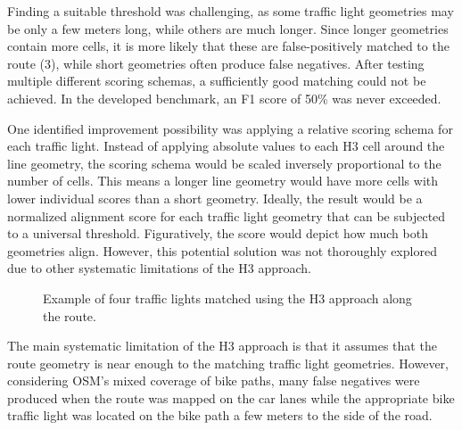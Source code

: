 Finding a suitable threshold was challenging, as some traffic light geometries may be only a few meters long, while others are much longer. Since longer geometries contain more cells, it is more likely that these are false-positively matched to the route (3), while short geometries often produce false negatives. After testing multiple different scoring schemas, a sufficiently good matching could not be achieved. In the developed benchmark, an F1 score of 50\% was never exceeded. 

One identified improvement possibility was applying a relative scoring schema for each traffic light. Instead of applying absolute values to each H3 cell around the line geometry, the scoring schema would be scaled inversely proportional to the number of cells. This means a longer line geometry would have more cells with lower individual scores than a short geometry. Ideally, the result would be a normalized alignment score for each traffic light geometry that can be subjected to a universal threshold. Figuratively, the score would depict how much both geometries align. However, this potential solution was not thoroughly explored due to other systematic limitations of the H3 approach.

\begin{figure}[t]
\centering
{}
\caption{Example of four traffic lights matched using the H3 approach along the route.}
\label{fig:sg-selection-h3-example}
\end{figure}

The main systematic limitation of the H3 approach is that it assumes that the route geometry is near enough to the matching traffic light geometries. However, considering OSM's mixed coverage of bike paths, many false negatives were produced when the route was mapped on the car lanes while the appropriate bike traffic light was located on the bike path a few meters to the side of the road.

